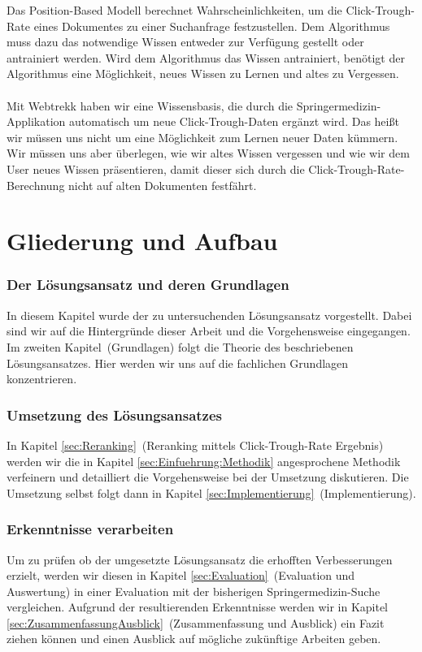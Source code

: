 Das Position-Based Modell berechnet Wahrscheinlichkeiten, um die Click-Trough-Rate eines Dokumentes zu einer Suchanfrage festzustellen. Dem Algorithmus muss dazu das notwendige Wissen entweder zur Verfügung gestellt oder antrainiert werden. Wird dem Algorithmus das Wissen antrainiert, benötigt der Algorithmus eine Möglichkeit, neues Wissen zu Lernen und altes zu Vergessen. 
\\
\\
Mit Webtrekk haben wir eine Wissensbasis, die durch die Springermedizin-Applikation automatisch um neue Click-Trough-Daten ergänzt wird. Das heißt wir müssen uns nicht um eine Möglichkeit zum Lernen neuer Daten kümmern. Wir müssen uns aber überlegen, wie wir altes Wissen vergessen und wie wir dem User neues Wissen präsentieren, damit dieser sich durch die Click-Trough-Rate-Berechnung nicht auf alten Dokumenten festfährt.


\section{Gliederung und Aufbau}
\label{sec:Einfuehrung:GliederungAufbau}

\subsubsection{Der Lösungsansatz und deren Grundlagen}
\label{sec:Einfuehrung:GliederungAufbau:Loesungsansatz}

In diesem Kapitel wurde der zu untersuchenden Lösungsansatz vorgestellt. Dabei sind wir auf die Hintergründe dieser Arbeit und die Vorgehensweise eingegangen. Im zweiten Kapitel~(Grundlagen) folgt die Theorie des beschriebenen Lösungsansatzes. Hier werden wir uns auf die fachlichen Grundlagen konzentrieren. 

\subsubsection{Umsetzung des Lösungsansatzes}
\label{sec:Einfuehrung:GliederungAufbau:Umsetzung}

In Kapitel \ref{sec:Reranking}~(Reranking mittels Click-Trough-Rate Ergebnis) werden wir die in Kapitel \ref{sec:Einfuehrung:Methodik} angesprochene Methodik verfeinern und detailliert die Vorgehensweise bei der Umsetzung diskutieren. Die Umsetzung selbst folgt dann in Kapitel \ref{sec:Implementierung}~(Implementierung).

\subsubsection{Erkenntnisse verarbeiten}
\label{sec:Einfuehrung:GliederungAufbau:Erkenntnisse}

Um zu prüfen ob der umgesetzte Lösungsansatz die erhofften Verbesserungen erzielt, werden wir diesen in Kapitel \ref{sec:Evaluation}~(Evaluation und Auswertung) in einer Evaluation mit der bisherigen Springermedizin-Suche vergleichen. Aufgrund der resultierenden Erkenntnisse werden wir in Kapitel \ref{sec:ZusammenfassungAusblick}~(Zusammenfassung und Ausblick) ein Fazit ziehen können und einen Ausblick auf mögliche zukünftige Arbeiten geben.